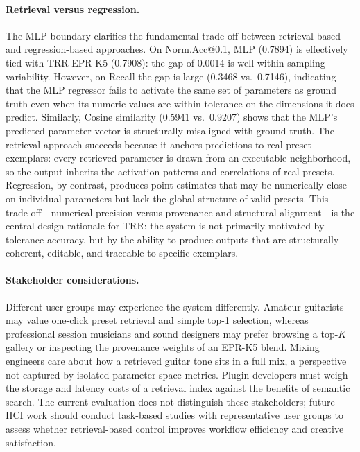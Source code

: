 \paragraph{Retrieval versus regression.} The MLP boundary clarifies the fundamental trade-off between retrieval-based and regression-based approaches. On Norm.Acc@0.1, MLP (0.7894) is effectively tied with TRR EPR-K5 (0.7908): the gap of 0.0014 is well within sampling variability. However, on Recall the gap is large (0.3468 vs.\ 0.7146), indicating that the MLP regressor fails to activate the same set of parameters as ground truth even when its numeric values are within tolerance on the dimensions it does predict. Similarly, Cosine similarity (0.5941 vs.\ 0.9207) shows that the MLP's predicted parameter vector is structurally misaligned with ground truth. The retrieval approach succeeds because it anchors predictions to real preset exemplars: every retrieved parameter is drawn from an executable neighborhood, so the output inherits the activation patterns and correlations of real presets. Regression, by contrast, produces point estimates that may be numerically close on individual parameters but lack the global structure of valid presets. This trade-off---numerical precision versus provenance and structural alignment---is the central design rationale for TRR: the system is not primarily motivated by tolerance accuracy, but by the ability to produce outputs that are structurally coherent, editable, and traceable to specific exemplars.

\paragraph{Stakeholder considerations.} Different user groups may experience the system differently. Amateur guitarists may value one-click preset retrieval and simple top-1 selection, whereas professional session musicians and sound designers may prefer browsing a top-$K$ gallery or inspecting the provenance weights of an EPR-K5 blend. Mixing engineers care about how a retrieved guitar tone sits in a full mix, a perspective not captured by isolated parameter-space metrics. Plugin developers must weigh the storage and latency costs of a retrieval index against the benefits of semantic search. The current evaluation does not distinguish these stakeholders; future HCI work should conduct task-based studies with representative user groups to assess whether retrieval-based control improves workflow efficiency and creative satisfaction.

